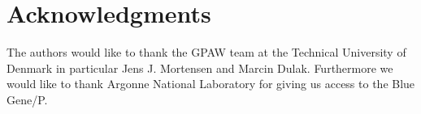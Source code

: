 \documentclass[conference]{IEEEtran}
\begin{document}
\section*{Acknowledgments}
The authors would like to thank the GPAW team at the Technical University of Denmark in particular Jens J. Mortensen and Marcin Dulak. Furthermore we would like to thank Argonne National Laboratory for giving us access to the Blue Gene/P.





%
%
%






\end{document}
